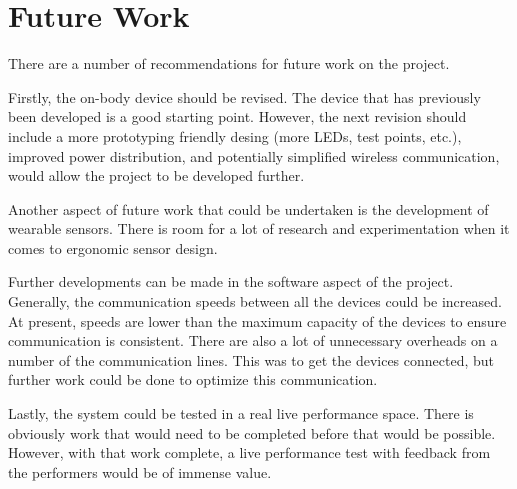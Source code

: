 \chapter{Future Work}
There are a number of recommendations for future work on the project.

Firstly, the on-body device should be revised.
The device that has previously been developed is a good starting point.
However, the next revision should include a more prototyping friendly desing (more LEDs, test points, etc.),
improved power distribution, and potentially simplified wireless communication,
would allow the project to be developed further.

Another aspect of future work that could be undertaken is the development of wearable sensors.
There is room for a lot of research and experimentation when it comes to ergonomic sensor design.

Further developments can be made in the software aspect of the project.
Generally, the communication speeds between all the devices could be increased.
At present, speeds are lower than the maximum capacity of the devices to ensure communication is consistent.
There are also a lot of unnecessary overheads on a number of the communication lines.
This was to get the devices connected, but further work could be done to optimize this communication.

Lastly, the system could be tested in a real live performance space.
There is obviously work that would need to be completed before that would be possible.
However, with that work complete, a live performance test with feedback from the performers would be of immense value.
